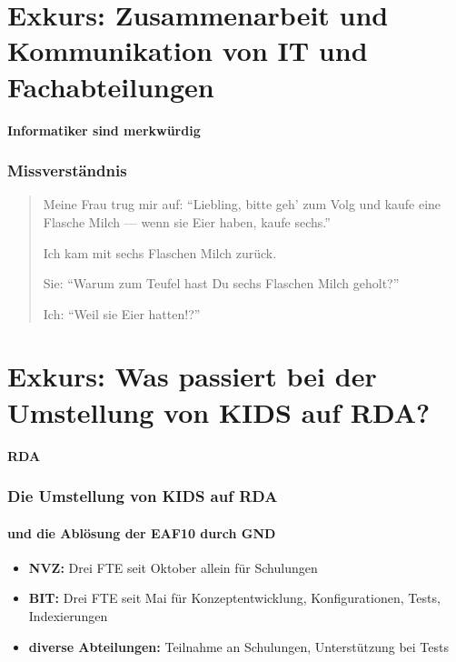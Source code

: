 \section{Exkurs: Zusammenarbeit und Kommunikation von IT und Fachabteilungen}
\begin{frame}[c]
\begin{center}
  \textbf{Informatiker sind merkwürdig}
\end{center}
\end{frame}

\begin{frame}[c]\frametitle{Missverständnis}
  \begin{quote}
    Meine Frau trug mir auf: ``Liebling, bitte geh' zum Volg und kaufe eine Flasche Milch --- wenn sie Eier haben, kaufe sechs.''

    Ich kam mit sechs Flaschen Milch zurück.

    Sie: ``Warum zum Teufel hast Du sechs Flaschen Milch geholt?''

    Ich: ``Weil sie Eier hatten!?''
  \end{quote}
\end{frame}

\section{Exkurs: Was passiert bei der Umstellung von KIDS auf RDA?}
\begin{frame}[c]
\begin{center}
  \textbf{RDA}
\end{center}
\end{frame}

\begin{frame}[c]\frametitle{Die Umstellung von KIDS auf RDA}
  \framesubtitle{und die Ablösung der EAF10 durch GND}
    \begin{itemize}
      \item \textbf{NVZ:} Drei FTE seit Oktober allein für Schulungen
      \item \textbf{BIT:} Drei FTE seit Mai für Konzeptentwicklung, Konfigurationen, Tests, Indexierungen
      \item \textbf{diverse Abteilungen:} Teilnahme an Schulungen, Unterstützung bei Tests
    \end{itemize}
\end{frame}

